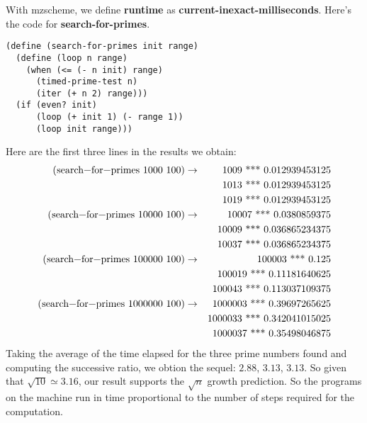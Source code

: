 \documentclass[a4paper,12pt]{article}
\begin{document}
With mzscheme, we define \textbf{runtime} as
\textbf{current-inexact-milliseconds}.  Here's
the code for \textbf{search-for-primes}.
\begin{lstlisting}
(define (search-for-primes init range)
  (define (loop n range)
    (when (<= (- n init) range)
	  (timed-prime-test n)
	  (iter (+ n 2) range)))
  (if (even? init)
      (loop (+ init 1) (- range 1))
      (loop init range)))
\end{lstlisting}
Here are the first three lines in the results we obtain:
\begin{eqnarray*}
\lstinline!(search-for-primes 1000 100)!
&\rightarrow&
1009 \mbox{ *** }0.012939453125 \\ &&
1013 \mbox{ *** }0.012939453125 \\ &&
1019 \mbox{ *** }0.012939453125 \\
\lstinline!(search-for-primes 10000 100)!
&\rightarrow&
10007 \mbox{ *** } 0.0380859375 \\ &&
10009 \mbox{ *** } 0.036865234375 \\ &&
10037 \mbox{ *** } 0.036865234375 \\
\lstinline!(search-for-primes 100000 100)!
&\rightarrow&
100003 \mbox{ *** } 0.125 \\ &&
100019 \mbox{ *** } 0.11181640625 \\ &&
100043 \mbox{ *** } 0.113037109375 \\
\lstinline!(search-for-primes 1000000 100)!
&\rightarrow&
1000003\mbox{ *** } 0.39697265625 \\ &&
1000033\mbox{ *** } 0.342041015025 \\ &&
1000037\mbox{ *** } 0.35498046875
\end{eqnarray*}
Taking the average of the time elapsed for the three prime numbers
found and computing the successive ratio, we
obtion the sequel: $2.88$, $3.13$, $3.13$.  So given that $\sqrt{10}
\simeq 3.16$, our result supports the $\sqrt{n}$ growth prediction.
So the programs on the machine run in time proportional to the number
of steps required for the computation.
\end{document}

